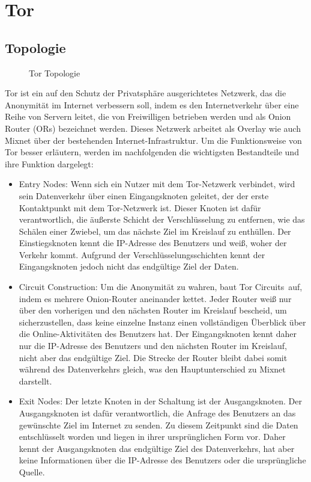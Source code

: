 \section{Tor}

\subsection{Topologie}

\begin{figure}[h!]
    \centering
    
    \caption{Tor Topologie}
    \label{imgs:tor}
\end{figure}

Tor ist ein auf den Schutz der Privatsphäre ausgerichtetes Netzwerk, das die Anonymität im Internet verbessern soll, indem es den Internetverkehr über eine Reihe von Servern leitet, die von Freiwilligen betrieben werden und als Onion Router (ORs) bezeichnet werden. Dieses Netzwerk arbeitet als Overlay wie auch Mixnet über der bestehenden Internet-Infrastruktur. Um die Funktionsweise von Tor besser erläutern, werden im nachfolgenden die wichtigsten Bestandteile und ihre Funktion dargelegt:

\begin{itemize}

\item Entry Nodes: Wenn sich ein Nutzer mit dem Tor-Netzwerk verbindet, wird sein Datenverkehr über einen Eingangsknoten geleitet, der der erste Kontaktpunkt mit dem Tor-Netzwerk ist. Dieser Knoten ist dafür verantwortlich, die äußerste Schicht der Verschlüsselung zu entfernen, wie das Schälen einer Zwiebel, um das nächste Ziel im Kreislauf zu enthüllen. Der Einstiegsknoten kennt die IP-Adresse des Benutzers und weiß, woher der Verkehr kommt. Aufgrund der Verschlüsselungsschichten kennt der Eingangsknoten jedoch nicht das endgültige Ziel der Daten.

\item Circuit Construction: Um die Anonymität zu wahren, baut Tor \glqq Circuits\grqq\ auf, indem es mehrere Onion-Router aneinander kettet. Jeder Router weiß nur über den vorherigen und den nächsten Router im Kreislauf bescheid, um sicherzustellen, dass keine einzelne Instanz einen vollständigen Überblick über die Online-Aktivitäten des Benutzers hat. Der Eingangsknoten kennt daher nur die IP-Adresse des Benutzers und den nächsten Router im Kreislauf, nicht aber das endgültige Ziel. Die Strecke der Router bleibt dabei somit während des Datenverkehrs gleich, was den Hauptunterschied zu Mixnet darstellt.

\item Exit Nodes: Der letzte Knoten in der Schaltung ist der Ausgangsknoten. Der Ausgangsknoten ist dafür verantwortlich, die Anfrage des Benutzers an das gewünschte Ziel im Internet zu senden. Zu diesem Zeitpunkt sind die Daten entschlüsselt worden und liegen in ihrer ursprünglichen Form vor. Daher kennt der Ausgangsknoten das endgültige Ziel des Datenverkehrs, hat aber keine Informationen über die IP-Adresse des Benutzers oder die ursprüngliche Quelle.

\end{itemize}

